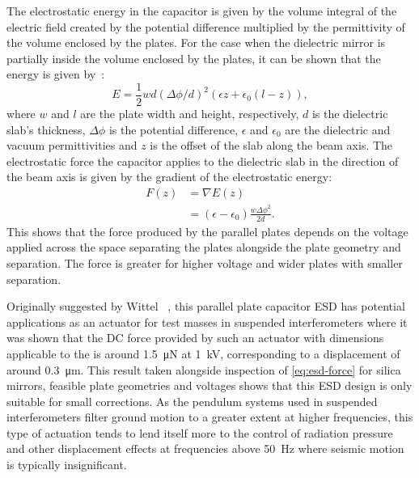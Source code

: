 The electrostatic energy in the capacitor is given by the volume integral of the electric field created by the potential difference multiplied by the permittivity of the volume enclosed by the plates. For the case when the dielectric mirror is partially inside the volume enclosed by the plates, it can be shown that the energy is given by~\cite{Margulies1984}:
\begin{equation}
  E = \frac{1}{2} w d \left( \Delta \phi / d \right)^2 \left( \epsilon z + \epsilon_0 \left( l - z \right) \right),
\end{equation}
where $w$ and $l$ are the plate width and height, respectively, $d$ is the dielectric slab's thickness, $\Delta \phi$ is the potential difference, $\epsilon$ and $\epsilon_0$ are the dielectric and vacuum permittivities and $z$ is the offset of the slab along the beam axis. The electrostatic force the capacitor applies to the dielectric slab in the direction of the beam axis is given by the gradient of the electrostatic energy:
\begin{equation}
  \label{eq:esd-force}
  \begin{split}
    F \left( z \right) &= \nabla E \left( z \right) \\
                       &= \left( \epsilon - \epsilon_0 \right) \frac{w \Delta \phi^2}{2 d}.
  \end{split}
\end{equation}
This shows that the force produced by the parallel plates depends on the voltage applied across the space separating the plates alongside the plate geometry and separation. The force is greater for higher voltage and wider plates with smaller separation.

Originally suggested by Wittel \etal{}~\cite{Wittel2015}, this parallel plate capacitor \gls{ESD} has potential applications as an actuator for test masses in suspended interferometers where it was shown that the \gls{DC} force provided by such an actuator with dimensions applicable to the \AEIPROTOTYPE{} is around \SI{1.5}{\micro\newton} at \SI{1}{\kilo\volt}, corresponding to a displacement of around \SI{0.3}{\micro\meter}. This result taken alongside inspection of \cref{eq:esd-force} for silica mirrors, feasible plate geometries and voltages shows that this \gls{ESD} design is only suitable for small corrections. As the pendulum systems used in suspended interferometers filter ground motion to a greater extent at higher frequencies, this type of actuation tends to lend itself more to the control of radiation pressure and other displacement effects at frequencies above \SI{50}{\hertz} where seismic motion is typically insignificant.

